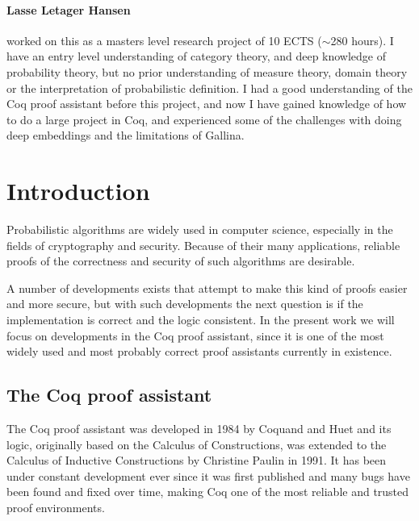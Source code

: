 \documentclass[11pt, leqno, titlepage]{article}
\theoremstyle{definition}
\begin{document}
\paragraph{Lasse Letager Hansen} worked on this as a masters level research project
of 10 ECTS ($\sim$280 hours). I have an entry level understanding of category theory,
and deep knowledge of probability theory, but no prior understanding of measure
theory, domain theory or the interpretation of probabilistic definition. I had a good
understanding of the Coq proof assistant before this project, and now I have gained
knowledge of how to do a large project in Coq, and experienced some of the challenges
with doing deep embeddings and the limitations of Gallina.

\vspace*{\fill}
\newpage

\tableofcontents
\newpage


\section{Introduction}
Probabilistic algorithms are widely used in computer science, especially in the
fields of cryptography and security. Because of their many applications, reliable
proofs of the correctness and security of such algorithms are desirable. 

A number of developments exists that attempt to make this kind of proofs easier and
more secure, but with such developments the next question is if the implementation is
correct and the logic consistent.  In the present work we will focus on developments
in the Coq proof assistant, since it is one of the most widely used and most probably
correct proof assistants currently in existence.

\subsection{The Coq proof assistant}
The Coq proof assistant was developed in 1984 by Coquand and Huet
\cite{coq-proof-ass} and its logic, originally based on the Calculus of
Constructions, was extended to the Calculus of Inductive Constructions by Christine
Paulin in 1991.  It has been under constant development ever since it was first
published and many bugs have been found and fixed over time, making Coq one of the
most reliable and trusted proof environments.
\end{document}
